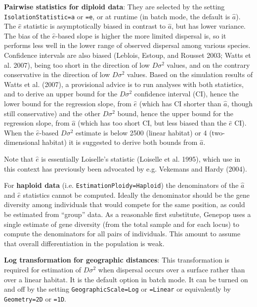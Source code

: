 \documentclass[12pt,]{book}
\begin{document}
\textbf{Pairwise statistics for diploid data}: They are selected by the
setting
\texttt{IsolationStatistic=a} or \texttt{=e}, or at runtime (in
batch mode, the default is \(\hat{a}\)). The \(\hat{e}\) statistic is
asymptotically biased in contrast to \(\hat{a}\), but has lower
variance. The bias of the \(\hat{e}\)-based slope is higher the more
limited dispersal is, so it performs less well in the lower range of
observed dispersal among various species. Confidence intervals are also
biased (Leblois, Estoup, and Rousset 2003; Watts et al. 2007), being too
short in the direction of low \(D\sigma^2\) values, and on the contrary
conservative in the direction of low \(D\sigma^2\) values. Based on the
simulation results of Watts et al. (2007), a provisional advice is to
run analyses with both statistics, and to derive an upper bound for the
\(D\sigma^2\) confidence interval (CI), hence the lower bound for the
regression slope, from \(\hat{e}\) (which has CI shorter than
\(\hat{a}\), though still conservative) and the other \(D\sigma^2\)
bound, hence the upper bound for the regression slope, from \(\hat{a}\)
(which has too short CI, but less biased than the \(\hat{e}\) CI). When
the \(\hat{e}\)-based \(D\sigma^2\) estimate is below 2500 (linear
habitat) or 4 (two-dimensional habitat) it is suggested to derive both
bounds from \(\hat{a}\).

Note that \(\hat{e}\) is essentially Loiselle's
statistic
(Loiselle et al. 1995), which use in this context has previously been
advocated by e.g. Vekemans and Hardy (2004).

For \textbf{haploid data} (i.e. \texttt{EstimationPloidy=Haploid}) the
denominators of the \(\hat{a}\) and \(\hat{e}\) statistics cannot be
computed. Ideally the denominator should be the gene diversity among
individuals that would compete for the same position, as could be
estimated from ``group'' data. As a reasonable first substitute, Genepop
uses a single estimate of gene diversity (from the total sample and for
each locus) to compute the denominators for all pairs of individuals.
This amount to assume that overall differentiation in the population is
weak.

\textbf{Log transformation for geographic distances}: This
transformation is required for estimation of \(D\sigma^2\) when
dispersal occurs over a surface rather than over a linear habitat. It is
the default option in batch mode. It can be turned on and off by the
setting \texttt{GeographicScale=Log} or
\texttt{=Linear} or equivalently by \texttt{Geometry=2D} or
\texttt{=1D}.
\end{document}
